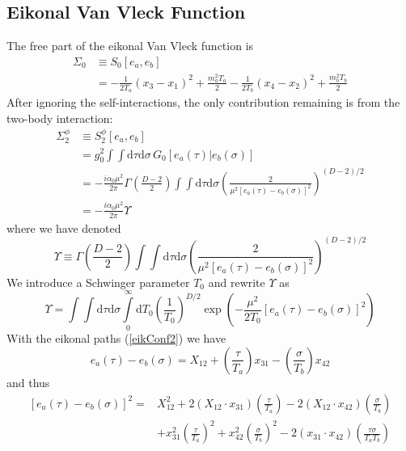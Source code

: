 \subsection{Eikonal Van Vleck Function\label{EVVFun}}
The free part of the eikonal Van Vleck function is
\begin{align}
	\Sigma_{0} &\equiv S_{0}\left[ e_{a}, e_{b} \right] \nonumber \\
	&= -\frac{1}{2 T_{a}} (x_{3} - x_{1})^{2} + \frac{m_{a}^{2} T_{a}}{2} -\frac{1}{2 T_{b}} (x_{4} - x_{2})^{2} + \frac{m_{b}^{2} T_{b}}{2} \label{Sigma0}
\end{align}
After ignoring the self-interactions, the only contribution remaining is from the two-body interaction:
\begin{align}
	\Sigma_{2}^{\phi} &\equiv S_{2}^{\phi}\left[ e_{a}, e_{b} \right] \nonumber \\
	&= g^{2}_{0} \int \int \mathrm{d}\tau \mathrm{d}\sigma \, G_{0} \left[ e_{a}(\tau) | e_{b}(\sigma) \right] \nonumber \\
	&= -\frac{i \alpha_{0} \mu^{2}}{2 \pi} \Gamma\left( \frac{D - 2}{2} \right) \int \int \mathrm{d}\tau \mathrm{d}\sigma \left( \frac{2}{\mu^{2} \left[ e_{a}(\tau) - e_{b}(\sigma) \right]^{2}} \right)^{(D - 2)/2} \nonumber \\
	&= -\frac{i \alpha_{0} \mu^{2}}{2 \pi} \Upsilon \label{Sig2Phi}
\end{align}
where we have denoted
\begin{equation}
	\Upsilon \equiv \Gamma\left( \frac{D - 2}{2} \right) \int \int \mathrm{d}\tau \mathrm{d}\sigma \left( \frac{2}{\mu^{2} \left[ e_{a}(\tau) - e_{b}(\sigma) \right]^{2}} \right)^{(D - 2)/2} \label{upsi}
\end{equation}
We introduce a Schwinger parameter $T_{0}$ and rewrite $\Upsilon$ as
\begin{equation}
	\Upsilon = \int \int \mathrm{d}\tau \mathrm{d}\sigma \int\limits_{0}^{\infty} \mathrm{d}T_{0} \left( \frac{1}{T_{0}} \right)^{D/2} \exp{\left( -\frac{\mu^{2}}{2 T_{0}} \left[ e_{a}(\tau) - e_{b}(\sigma) \right]^{2} \right)} \label{Sigmaphi}
\end{equation}
With the eikonal paths (\ref{eikConf2}) we have
\begin{equation}
	e_{a}(\tau) - e_{b}(\sigma) = X_{12} + \left( \frac{\tau}{T_{a}} \right) x_{31} - \left( \frac{\sigma}{T_{b}} \right) x_{42}
\end{equation}
and thus
\begin{equation}
\begin{split}
	\left[ e_{a}(\tau) - e_{b}(\sigma) \right]^{2} = {}& X_{12}^{2} + 2 \left( X_{12} \cdot x_{31} \right) \left( \frac{\tau}{T_{a}} \right) - 2 \left( X_{12} \cdot x_{42} \right) \left( \frac{\sigma}{T_{b}} \right) \\
	&+ x_{31}^{2} \left( \frac{\tau}{T_{a}} \right)^{2} + x_{42}^{2} \left( \frac{\sigma}{T_{b}} \right)^{2} - 2 \left( x_{31} \cdot x_{42} \right) \left( \frac{\tau \sigma}{T_{a} T_{b}} \right)
\end{split}
\end{equation}
